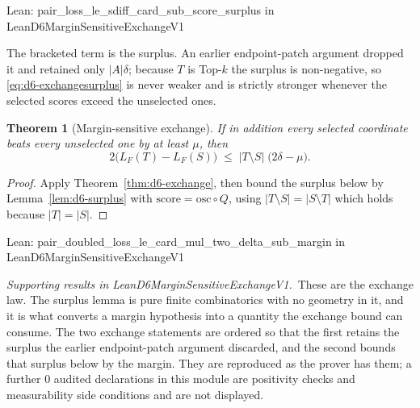 \documentclass[conference]{IEEEtran}
\newtheorem{theorem}{Theorem}
\theoremstyle{definition}
\newcommand{\lean}[1]{\textsf{\footnotesize #1}}
\newcommand{\leanbox}[1]{%
  \par\vspace{2pt}\noindent
  {\footnotesize\textsf{Lean: #1}}\par\vspace{2pt}}
\begin{document}
\leanbox{\lean{pair\_loss\_le\_sdiff\_card\_sub\_score\_surplus} in
\lean{LeanD6MarginSensitiveExchangeV1}}

The bracketed term is the surplus. An earlier endpoint-patch argument dropped it and retained
only $|A|\delta$; because $T$ is Top-$k$ the surplus is non-negative, so
\eqref{eq:d6-exchangesurplus} is never weaker and is strictly stronger whenever the selected
scores exceed the unselected ones.

\begin{theorem}[Margin-sensitive exchange]
\label{thm:d6-marginexchange}
If in addition every selected coordinate beats every unselected one by at least $\mu$, then
\begin{equation}
2\bigl(L_{F}(T)-L_{F}(S)\bigr)\;\leq\;|T\setminus S|\;\bigl(2\delta-\mu\bigr).
\label{eq:d6-marginexchange}
\end{equation}
\end{theorem}

\begin{proof}
Apply Theorem~\ref{thm:d6-exchange}, then bound the surplus below by Lemma~\ref{lem:d6-surplus}
with $\mathrm{score}=\mathrm{osc}\circ Q$, using $|T\setminus S|=|S\setminus T|$ which holds
because $|T|=|S|$.
\end{proof}

\leanbox{\lean{pair\_doubled\_loss\_le\_card\_mul\_two\_delta\_sub\_margin} in
\lean{LeanD6MarginSensitiveExchangeV1}}

\noindent\emph{Supporting results in \lean{LeanD6MarginSensitiveExchangeV1}.}~These are the exchange law. The surplus lemma is pure finite combinatorics with no geometry in it, and it is what converts a margin hypothesis into a quantity the exchange bound can consume. The two exchange statements are ordered so that the first retains the surplus the earlier endpoint-patch argument discarded, and the second bounds that surplus below by the margin. They are reproduced as the prover has them; a further $0$ audited declarations in this module are positivity checks and measurability side conditions and are not displayed.
\end{document}
